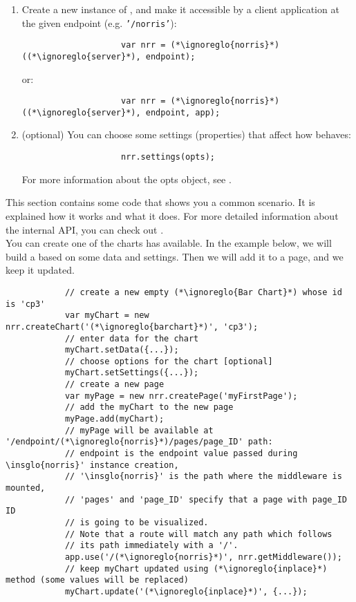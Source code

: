 \begin{itemize}
\begin{enumerate}
\begin{lstlisting}
					var (*\ignoreglo{norris}*) = require('(*\ignoreglo{norris}*)');
				\end{lstlisting}
				\item Create a new instance of , and make it accessible by a client application at the given endpoint (e.g. \texttt{'/norris'}):
				\begin{lstlisting}
					var nrr = (*\ignoreglo{norris}*)((*\ignoreglo{server}*), endpoint);
				\end{lstlisting}
				or:
				\begin{lstlisting}
					var nrr = (*\ignoreglo{norris}*)((*\ignoreglo{server}*), endpoint, app);
				\end{lstlisting}
				\item (optional) You can choose some settings (properties) that affect how  behaves:
				\begin{lstlisting}
					nrr.settings(opts);
				\end{lstlisting}
				For more information about the opts object, see .
			\end{enumerate}
		\end{itemize}
		This section contains some code that shows you a common scenario. It is explained how it works and what it does. For more detailed information about the internal API, you can check out .\\
		You can create one of the charts  has available. In the example below, we will build a  based on some data and settings. Then we will add it to a page, and we keep it updated.
		\begin{lstlisting}
			// create a new empty (*\ignoreglo{Bar Chart}*) whose id is 'cp3'
			var myChart = new nrr.createChart('(*\ignoreglo{barchart}*)', 'cp3');
			// enter data for the chart
			myChart.setData({...});
			// choose options for the chart [optional]
			myChart.setSettings({...});
			// create a new page
			var myPage = new nrr.createPage('myFirstPage');
			// add the myChart to the new page
			myPage.add(myChart);
			// myPage will be available at '/endpoint/(*\ignoreglo{norris}*)/pages/page_ID' path:
			// endpoint is the endpoint value passed during \insglo{norris}' instance creation,
			// '\insglo{norris}' is the path where the middleware is mounted, 
			// 'pages' and 'page_ID' specify that a page with page_ID ID 
			// is going to be visualized. 
			// Note that a route will match any path which follows 
			// its path immediately with a '/'.
			app.use('/(*\ignoreglo{norris}*)', nrr.getMiddleware());
			// keep myChart updated using (*\ignoreglo{inplace}*) method (some values will be replaced)
			myChart.update('(*\ignoreglo{inplace}*)', {...});
		\end{lstlisting}
